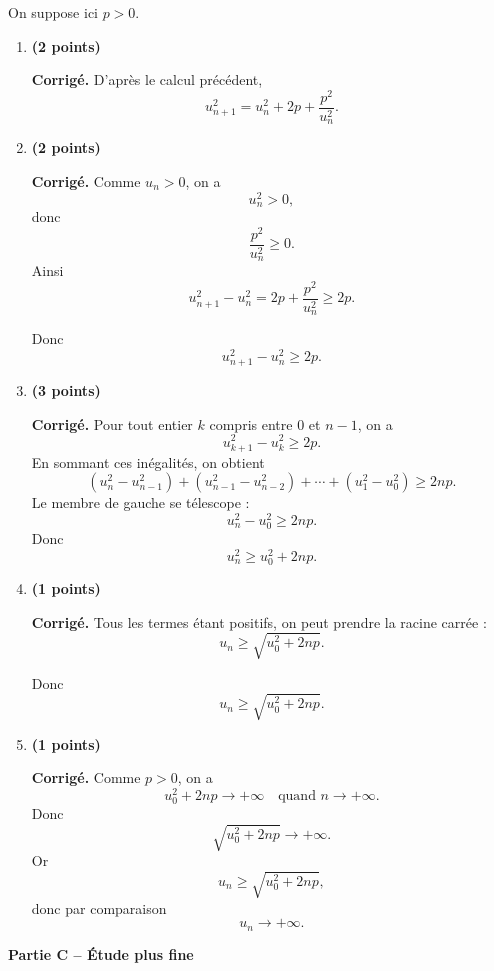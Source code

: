 \documentclass[11pt,a4paper]{article}
\newcommand{\bareme}[1]{\hfill{\color{blue!70!black}\textbf{(#1 points)}}}
\newcommand{\corr}{\noindent\textcolor{blue!70!black}{\textbf{Corrigé. }}}
\begin{document}
On suppose ici $p>0$.

\begin{enumerate}[label=\textbf{B.\arabic*.}, leftmargin=0.9cm]

\item \bareme{2}

\corr D’après le calcul précédent,
\[
\boxed{u_{n+1}^2=u_n^2+2p+\frac{p^2}{u_n^2}.}
\]

\item \bareme{2}

\corr Comme $u_n>0$, on a
\[
u_n^2>0,
\]
donc
\[
\frac{p^2}{u_n^2}\geq 0.
\]
Ainsi
\[
u_{n+1}^2-u_n^2=2p+\frac{p^2}{u_n^2}\geq 2p.
\]

Donc
\[
\boxed{u_{n+1}^2-u_n^2\geq 2p.}
\]

\item \bareme{3}

\corr Pour tout entier $k$ compris entre $0$ et $n-1$, on a
\[
u_{k+1}^2-u_k^2\geq 2p.
\]
En sommant ces inégalités, on obtient
\[
(u_n^2-u_{n-1}^2)+(u_{n-1}^2-u_{n-2}^2)+\cdots+(u_1^2-u_0^2)\geq 2np.
\]
Le membre de gauche se télescope :
\[
u_n^2-u_0^2\geq 2np.
\]
Donc
\[
\boxed{u_n^2\geq u_0^2+2np.}
\]

\item \bareme{1}

\corr Tous les termes étant positifs, on peut prendre la racine carrée :
\[
u_n\geq \sqrt{u_0^2+2np}.
\]

Donc
\[
\boxed{u_n\geq \sqrt{u_0^2+2np}.}
\]

\item \bareme{1}

\corr Comme $p>0$, on a
\[
u_0^2+2np\longrightarrow +\infty
\quad \text{quand } n\to+\infty.
\]
Donc
\[
\sqrt{u_0^2+2np}\longrightarrow +\infty.
\]
Or
\[
u_n\geq \sqrt{u_0^2+2np},
\]
donc par comparaison
\[
\boxed{u_n\longrightarrow +\infty.}
\]

\end{enumerate}

\medskip

\textbf{Partie C -- Étude plus fine}
\end{document}
